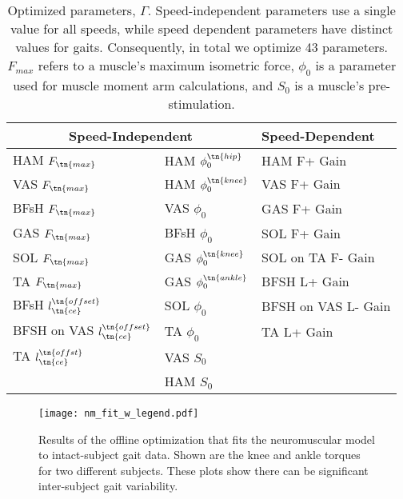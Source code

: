 \begin{table}    
    \centering
    \begin{tabular}{ll|l}
        \multicolumn{2}{c|}{Speed-Independent} & Speed-Dependent \\
        \midrule
        HAM $F_\tn{max}$                    & HAM $\phi_0^\tn{hip}$   & HAM F+ Gain         \\
        VAS $F_\tn{max}$                    & HAM $\phi_0^\tn{knee}$  & VAS F+ Gain         \\
        BFsH $F_\tn{max}$                   & VAS $\phi_0$            & GAS F+ Gain         \\
        GAS $F_\tn{max}$                    & BFsH $\phi_0$           & SOL F+ Gain         \\
        SOL $F_\tn{max}$                    & GAS $\phi_0^\tn{knee}$  & SOL on TA F- Gain   \\
        TA  $F_\tn{max}$                    & GAS $\phi_0^\tn{ankle}$ & BFSH L+ Gain        \\
        BFsH $l_\tn{ce}^\tn{offset}$        & SOL $\phi_0$            & BFSH on VAS L- Gain \\
        BFSH on VAS $l_\tn{ce}^\tn{offset}$ & TA  $\phi_0$            & TA L+ Gain          \\
        TA $l_\tn{ce}^\tn{offst}$           & VAS $S_0$               &                     \\
                                            & HAM $S_0$               &                     \\
    \end{tabular}
    \caption{Optimized parameters, $\Gamma$. Speed-independent parameters use a
    single value for all speeds, while speed dependent parameters have distinct
    values for  gaits. Consequently, in total
    we optimize 43 parameters. $F_{max}$ refers to a muscle's maximum isometric
    force, $\phi_0$ is a parameter used for muscle moment arm calculations, and
    $S_0$ is a muscle's pre-stimulation.}\label{tab:params}
\end{table}

\begin{figure}
    \centering 
    \texttt{[image: nm\_fit\_w\_legend.pdf]}
    \caption{Results of the offline optimization that fits the neuromuscular
    model to intact-subject gait data. Shown are the knee and ankle torques for
    two different subjects. These plots show there can be significant
    inter-subject gait variability.}\label{fig:nm_fit}
\end{figure}

